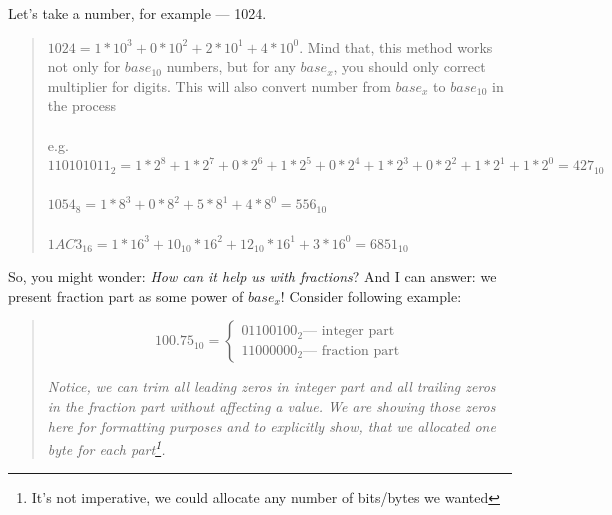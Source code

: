 \documentclass{article}
\begin{document}
            Let's take a number, for example --- 1024. 
            
            \begin{quote}
                $1024 = 1 * 10^3 + 0 * 10^2 + 2 * 10^1 + 4 * 10^0$. Mind that, this method works not only for $base_{10}$ numbers, but for any $base_x$, you should only correct
                multiplier for digits. This will also convert number from $base_x$ to $base_{10}$ in the process\\\\
                e.g.\\
                $110101011_2 = 1 * 2^8 + 1 * 2^7 + 0 * 2^6 + 1 * 2^5 + 0 * 2^4 + 1 * 2^3 + 0 * 2^2 + 1 * 2^1 + 1 * 2^0 = 427_{10}$ \\\\                    
                $1054_8 = 1 * 8^3 + 0 * 8^2 + 5 * 8^1 + 4 * 8^0 = 556_{10}$\\\\
                $1AC3_{16} = 1 * 16^3 + 10_{10} * 16^2 + 12_{10} * 16^1 + 3 * 16^0 = 6851_{10}$
            \end{quote}

            So, you might wonder: \emph{How can it help us with fractions}? And I can answer: we present fraction part as some power of $base_x$! Consider following
            example:

            \begin{quote}
                \begin{equation*}
                    100.75_{10} = \begin{cases}
                            01100100_2 \text{--- integer part}\\
                            11000000_2 \text{--- fraction part}
                        \end{cases}
                    \end{equation*}

                    \emph{
                        Notice, we can trim all leading zeros in \emph{integer part} and all trailing zeros in the \emph{fraction part} without affecting a value.
                        We are showing those zeros here for formatting purposes and to explicitly show, that we allocated one byte for each part\footnote{It's not imperative,
                        we could allocate any number of bits/bytes we wanted}.
                    }
            \end{quote}
            
\end{document}
